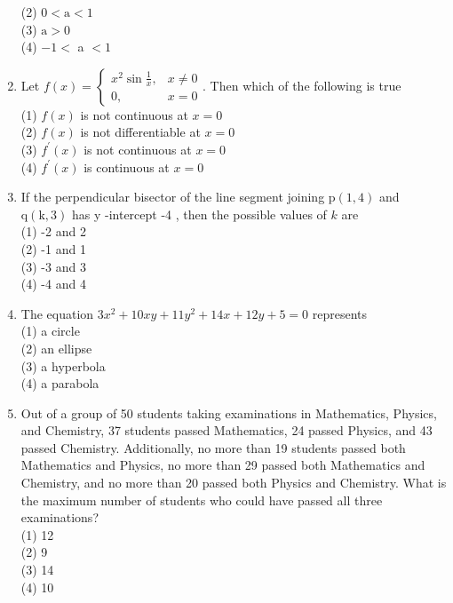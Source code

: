 \documentclass[10pt]{article}
\begin{document}
\begin{enumerate}
(2) $0<\mathrm{a}<1$\\
(3) $\mathrm{a}>0$\\
(4) $-1<$ a $<1$
  \item Let $f(x)=\left\{\begin{array}{cl}x^{2} \sin \frac{1}{x}, & x \neq 0 \\ 0, & x=0\end{array}\right.$. Then which of the following is true\\
(1) $f(x)$ is not continuous at $x=0$\\
(2) $f(x)$ is not differentiable at $x=0$\\
(3) $f^{\prime}(x)$ is not continuous at $x=0$\\
(4) $f^{\prime}(x)$ is continuous at $x=0$
  \item If the perpendicular bisector of the line segment joining $\mathrm{p}(1,4)$ and $\mathrm{q}(\mathrm{k}, 3)$ has y -intercept -4 , then the possible values of $k$ are\\
(1) -2 and 2\\
(2) -1 and 1\\
(3) -3 and 3\\
(4) -4 and 4
  \item The equation $3 x^{2}+10 x y+11 y^{2}+14 x+12 y+5=0$ represents\\
(1) a circle\\
(2) an ellipse\\
(3) a hyperbola\\
(4) a parabola
  \item Out of a group of 50 students taking examinations in Mathematics, Physics, and Chemistry, 37 students passed Mathematics, 24 passed Physics, and 43 passed Chemistry. Additionally, no more than 19 students passed both Mathematics and Physics, no more than 29 passed both Mathematics and Chemistry, and no more than 20 passed both Physics and Chemistry. What is the maximum number of students who could have passed all three examinations?\\
(1) 12\\
(2) 9\\
(3) 14\\
(4) 10
\end{enumerate}
\end{document}
